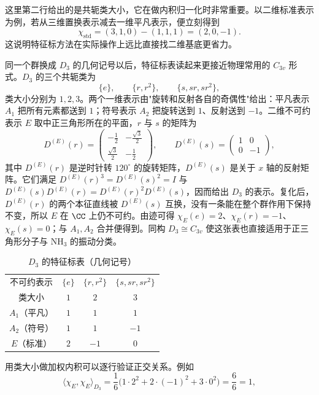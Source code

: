 这里第二行给出的是共轭类大小，它在做内积归一化时非常重要。以二维标准表示为例，若从三维置换表示减去一维平凡表示，便立刻得到
\[
\chi_{\mathrm{std}}=(3,1,0)-(1,1,1)=(2,0,-1).
\]
这说明特征标方法在实际操作上远比直接找二维基底更省力。

同一个群换成 $D_3$ 的几何记号以后，特征标表读起来更接近物理常用的 $C_{3v}$ 形式。$D_3$ 的三个共轭类为
\[
\{e\},\qquad \{r,r^2\},\qquad \{s,sr,sr^2\},
\]
类大小分别为 $1,2,3$。两个一维表示由"旋转和反射各自的奇偶性"给出：平凡表示 $A_1$ 把所有元素都送到 $1$；符号表示 $A_2$ 把旋转送到 $1$、反射送到 $-1$。二维不可约表示 $E$ 取中正三角形所在的平面，$r$ 与 $s$ 的矩阵为
\begin{equation}
D^{(E)}(r)=
\begin{pmatrix}
-\tfrac12&-\tfrac{\sqrt3}{2}\\[2pt]
\tfrac{\sqrt3}{2}&-\tfrac12
\end{pmatrix},
\qquad
D^{(E)}(s)=
\begin{pmatrix}
1&0\\0&-1
\end{pmatrix},
\label{eq:d3-E-matrices}
\end{equation}
其中 $D^{(E)}(r)$ 是逆时针转 $120^\circ$ 的旋转矩阵，$D^{(E)}(s)$ 是关于 $x$ 轴的反射矩阵。它们满足
$D^{(E)}(r)^3=D^{(E)}(s)^2=I$ 与
$D^{(E)}(s)D^{(E)}(r)=D^{(E)}(r)^2D^{(E)}(s)$，因而给出 $D_3$ 的表示。复化后，$D^{(E)}(r)$ 的两个本征直线被 $D^{(E)}(s)$ 互换，没有一条能在整个群作用下保持不变，所以 $E$ 在 $\CC$ 上仍不可约。由迹可得
$\chi_E(e)=2$、$\chi_E(r)=-1$、$\chi_E(s)=0$；与 $A_1,A_2$ 合并便得到。同构 $D_3\cong C_{3v}$ 使这张表也直接适用于正三角形分子与 $\mathrm{NH_3}$ 的振动分类。
\begin{table}[htbp]
\centering
\caption{$D_3$ 的特征标表（几何记号）}
\label{tab:d3-character-table}
\begin{tabular}{c|ccc}
\toprule
不可约表示 & $\{e\}$ & $\{r,r^2\}$ & $\{s,sr,sr^2\}$ \\
类大小 & $1$ & $2$ & $3$ \\
\midrule
$A_1$（平凡） & $1$ & $1$ & $1$ \\
$A_2$（符号） & $1$ & $1$ & $-1$ \\
$E$（标准）   & $2$ & $-1$ & $0$ \\
\bottomrule
\end{tabular}
\end{table}
用类大小做加权内积可以逐行验证正交关系。例如
\[
\langle\chi_E,\chi_E\rangle_{D_3}
=\frac{1}{6}\bigl(1\cdot2^2+2\cdot(-1)^2+3\cdot0^2\bigr)=\frac{6}{6}=1,
\]
